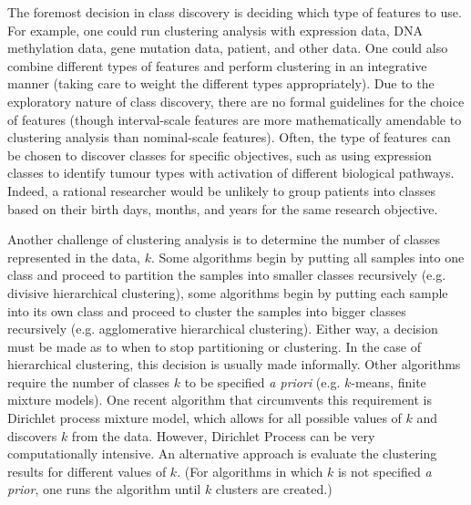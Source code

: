 The foremost decision in class discovery is deciding which type of features to use. For example, one could run clustering analysis with expression data, DNA methylation data, gene mutation data, patient, and other data. One could also combine different types of features and perform clustering in an integrative manner (taking care to weight the different types appropriately). Due to the exploratory nature of class discovery, there are no formal guidelines for the choice of features (though interval-scale features are more mathematically amendable to clustering analysis than nominal-scale features). Often, the type of features can be chosen to discover classes for specific objectives, such as using expression classes to identify tumour types with activation of different biological pathways. Indeed, a rational researcher would be unlikely to group patients into classes based on their birth days, months, and years for the same research objective.

Another challenge of clustering analysis is to determine the number of classes represented in the data, $k$. Some algorithms begin by putting all samples into one class and proceed to partition the samples into smaller classes recursively (e.g. divisive hierarchical clustering), some algorithms begin by putting each sample into its own class and proceed to cluster the samples into bigger classes recursively (e.g. agglomerative hierarchical clustering). Either way, a decision must be made as to when to stop partitioning or clustering. In the case of hierarchical clustering, this decision is usually made informally. Other algorithms require the number of classes $k$ to be specified \emph{a priori} (e.g. $k$-means, finite mixture models). One recent algorithm that circumvents this requirement is Dirichlet process mixture model, which allows for all possible values of $k$ and discovers $k$ from the data. However, Dirichlet Process can be very computationally intensive. An alternative approach is evaluate the clustering results for different values of $k$. (For algorithms in which $k$ is not specified \emph{a prior}, one runs the algorithm until $k$ clusters are created.)

